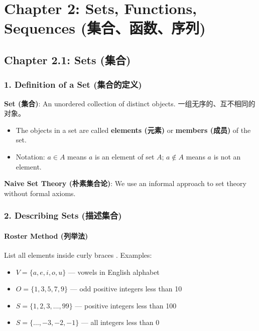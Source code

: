 \documentclass[10pt,a4paper,openany]{ctexbook}
\theoremstyle{definition}
\theoremstyle{remark}
\begin{document}
\chapter{Chapter 2: Sets, Functions, Sequences (集合、函数、序列)}

\section{Chapter 2.1: Sets (集合)}

\vspace{-2pt}

\subsection{1. Definition of a Set (集合的定义)}

\textbf{Set (集合)}: An unordered collection of distinct objects. 一组无序的、互不相同的对象。
\begin{itemize}
\item The objects in a set are called \textbf{elements (元素)} or \textbf{members (成员)} of the set.
\item Notation: $a \in A$ means $a$ is an element of set $A$; $a \notin A$ means $a$ is not an element.

\end{itemize}

\textbf{Naive Set Theory (朴素集合论)}: We use an informal approach to set theory without formal axioms.
\vspace{-2pt}

\subsection{2. Describing Sets (描述集合)}

\subsubsection{Roster Method (列举法)}

List all elements inside curly braces \texttt{{}}.
Examples:
\begin{itemize}
\item $V = \{a, e, i, o, u\}$ — vowels in English alphabet
\item $O = \{1, 3, 5, 7, 9\}$ — odd positive integers less than 10
\item $S = \{1, 2, 3, \dots, 99\}$ — positive integers less than 100
\item $S = \{\dots, -3, -2, -1\}$ — all integers less than 0

\end{itemize}
\end{document}
